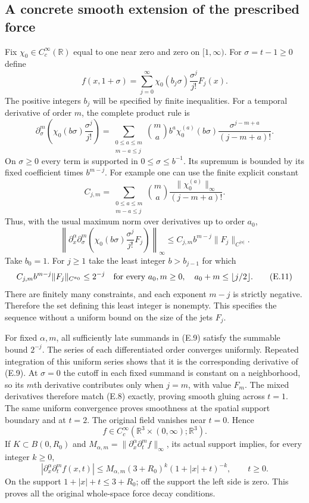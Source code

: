 \documentclass[10pt,a4paper]{article}
\newcounter{none}
\begin{document}
\subsection{A concrete smooth extension of the prescribed force}

Fix $\chi_0\in C_c^\infty(\mathbb R)$ equal to one near zero and
zero on $[1,\infty)$. For $\sigma=t-1\ge0$ define
\[
 f(x,1+\sigma)=
 \sum_{j=0}^\infty \chi_0(b_j\sigma)\frac{\sigma^j}{j!}F_j(x).
 \tag{E.9}
\]
The positive integers $b_j$ will be specified by finite inequalities.
For a temporal derivative of order $m$, the complete product rule is
\[
 \partial_\sigma^m\left(\chi_0(b\sigma)\frac{\sigma^j}{j!}\right)
 =\sum_{\substack{0\le a\le m\\m-a\le j}}
   \binom ma b^a\chi_0^{(a)}(b\sigma)
                    \frac{\sigma^{j-m+a}}{(j-m+a)!}.
\]
On $\sigma\ge0$ every term is supported in $0\le\sigma\le b^{-1}$.
Its supremum is bounded by its fixed coefficient times $b^{m-j}$.
For example one can use the finite explicit constant
\[
 C_{j,m}=\sum_{\substack{0\le a\le m\\m-a\le j}}
        \binom ma\frac{\|\chi_0^{(a)}\|_\infty}{(j-m+a)!}.
\]
Thus, with the usual maximum norm over derivatives up to order $a_0$,
\[
 \left\|\partial_x^\alpha\partial_\sigma^m
       \left(\chi_0(b\sigma)\frac{\sigma^j}{j!}F_j\right)\right\|_\infty
 \le C_{j,m}b^{m-j}\|F_j\|_{C^{|\alpha|}}.
 \tag{E.10}
\]
Take $b_0=1$. For $j\ge1$ take the least integer $b>b_{j-1}$
for which
\[
 C_{j,m}b^{m-j}\|F_j\|_{C^{a_0}}\le2^{-j}
 \quad\hbox{for every }a_0,m\ge0,\quad
                   a_0+m\le\lfloor j/2\rfloor.
 \tag{E.11}
\]
There are finitely many constraints, and each exponent $m-j$ is
strictly negative. Therefore the set defining this least integer is
nonempty. This specifies the sequence without a uniform bound on the
size of the jets $F_j$.

For fixed $\alpha,m$, all sufficiently late summands in (E.9) satisfy
the summable bound $2^{-j}$. The series of each differentiated order
converges uniformly. Repeated integration of this uniform series
shows that it is the corresponding derivative of (E.9). At $\sigma=0$
the cutoff in each fixed summand is constant on a neighborhood, so its
$m$th derivative contributes only when $j=m$, with value $F_m$.
The mixed derivatives therefore match (E.8) exactly, proving smooth
gluing across $t=1$. The same uniform convergence proves smoothness
at the spatial support boundary and at $t=2$. The original field
vanishes near $t=0$. Hence
\[
 f\in C_c^\infty(\mathbb R^3\times(0,\infty);\mathbb R^3).
 \tag{E.12}
\]
If $K\subset B(0,R_0)$ and
$M_{\alpha,m}=\|\partial_x^\alpha\partial_t^mf\|_\infty$, its
actual support implies, for every integer $k\ge0$,
\[
 |\partial_x^\alpha\partial_t^mf(x,t)|
 \le M_{\alpha,m}(3+R_0)^k(1+|x|+t)^{-k},\qquad t\ge0.
 \tag{E.13}
\]
On the support $1+|x|+t\le3+R_0$; off the support the left side is
zero. This proves all the original whole-space force decay conditions.
\end{document}
